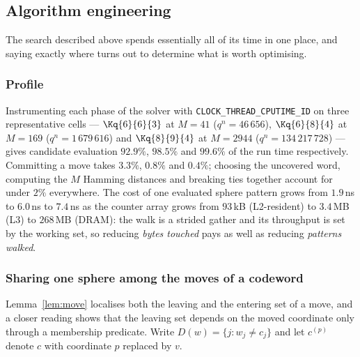 
\subsection{Algorithm engineering}\label{sec:engineering}

The search described above spends essentially all of its time in one place, and
saying exactly where turns out to determine what is worth optimising.

\subsubsection*{Profile}

Instrumenting each phase of the solver with \texttt{CLOCK\_THREAD\_CPUTIME\_ID}
on three representative cells --- $\Kq{6}{6}{3}$ at $M=41$ ($q^n=46\,656$),
$\Kq{6}{8}{4}$ at $M=169$ ($q^n=1\,679\,616$) and $\Kq{8}{9}{4}$ at $M=2944$
($q^n=134\,217\,728$) --- gives candidate evaluation $92.9\%$, $98.5\%$ and
$99.6\%$ of the run time respectively. Committing a move takes $3.3\%$,
$0.8\%$ and $0.4\%$; choosing the uncovered word, computing the $M$ Hamming
distances and breaking ties together account for under $2\%$ everywhere.
The cost of one evaluated sphere pattern grows from $1.9$\,ns to $6.0$\,ns to
$7.4$\,ns as the counter array grows from $93$\,kB (L2-resident) to $3.4$\,MB
(L3) to $268$\,MB (DRAM): the walk is a strided gather and its throughput is
set by the working set, so reducing \emph{bytes touched} pays as well as
reducing \emph{patterns walked}.

\subsubsection*{Sharing one sphere among the moves of a codeword}

Lemma~\ref{lem:move} localises both the leaving and the entering set of a move,
and a closer reading shows that the leaving set depends on the moved
coordinate only through a membership predicate. Write $D(w)=\{j: w_j\neq c_j\}$
and let $c^{(p)}$ denote $c$ with coordinate $p$ replaced by $v$.

